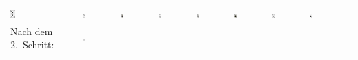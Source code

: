 \begin{tabular}{m{30mm}m{11mm}m{11mm}m{11mm}m{11mm}m{11mm}m{11mm}m{11mm}m{11mm}}
\includegraphics[width=0.08\textwidth]{./inf/SEKII/19_Java_Sortierverfahren/Pik8.png}
&
\includegraphics[width=0.08\textwidth]{./inf/SEKII/19_Java_Sortierverfahren/Pik10.png}
&
\includegraphics[width=0.08\textwidth]{./inf/SEKII/19_Java_Sortierverfahren/PikBube.png}
&
\includegraphics[width=0.08\textwidth]{./inf/SEKII/19_Java_Sortierverfahren/Pik7.png}
&
\includegraphics[width=0.08\textwidth]{./inf/SEKII/19_Java_Sortierverfahren/PikKoenig.png}
&
\includegraphics[width=0.08\textwidth]{./inf/SEKII/19_Java_Sortierverfahren/PikDame.png}
&
\includegraphics[width=0.08\textwidth]{./inf/SEKII/19_Java_Sortierverfahren/Pik9.png}
&
\includegraphics[width=0.08\textwidth]{./inf/SEKII/19_Java_Sortierverfahren/PikAs.png}
\\
Nach dem 2.\ Schritt: &
\includegraphics[width=0.08\textwidth]{./inf/SEKII/19_Java_Sortierverfahren/Pik8.png}

\end{tabular}
